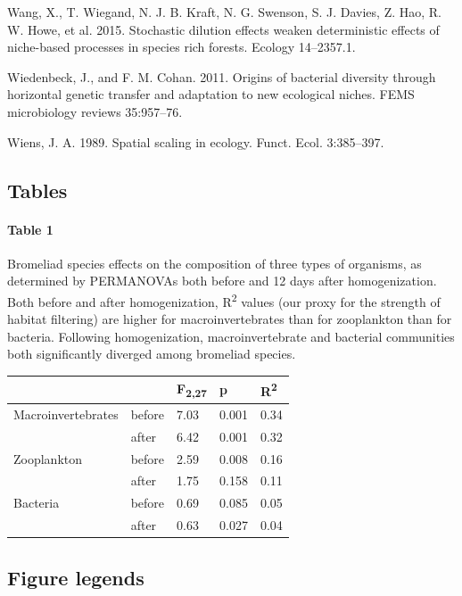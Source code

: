 \documentclass[12pt,]{article}
\let\oldparagraph\paragraph
\renewcommand{\paragraph}[1]{\oldparagraph{#1}\mbox{}}
\begin{document}
\hypertarget{ref-Wang}{}
Wang, X., T. Wiegand, N. J. B. Kraft, N. G. Swenson, S. J. Davies, Z.
Hao, R. W. Howe, et al. 2015. Stochastic dilution effects weaken
deterministic effects of niche-based processes in species rich forests.
Ecology 14--2357.1.

\hypertarget{ref-Wiedenbeck2011}{}
Wiedenbeck, J., and F. M. Cohan. 2011. Origins of bacterial diversity
through horizontal genetic transfer and adaptation to new ecological
niches. FEMS microbiology reviews 35:957--76.

\hypertarget{ref-Wiens1989-vw}{}
Wiens, J. A. 1989. Spatial scaling in ecology. Funct. Ecol. 3:385--397.

\newpage

\subsection{Tables}\label{tables}

\paragraph{Table 1}\label{table-1}

Bromeliad species effects on the composition of three types of
organisms, as determined by PERMANOVAs both before and 12 days after
homogenization. Both before and after homogenization,
R\textsuperscript{2} values (our proxy for the strength of habitat
filtering) are higher for macroinvertebrates than for zooplankton than
for bacteria. Following homogenization, macroinvertebrate and bacterial
communities both significantly diverged among bromeliad species.

\begin{longtable}[]{@{}lllll@{}}
\toprule
& & F\textsubscript{2,27} & p & R\textsuperscript{2}\tabularnewline
\midrule
\endhead
Macroinvertebrates & before & 7.03 & 0.001 & 0.34\tabularnewline
& after & 6.42 & 0.001 & 0.32\tabularnewline
Zooplankton & before & 2.59 & 0.008 & 0.16\tabularnewline
& after & 1.75 & 0.158 & 0.11\tabularnewline
Bacteria & before & 0.69 & 0.085 & 0.05\tabularnewline
& after & 0.63 & 0.027 & 0.04\tabularnewline
\bottomrule
\end{longtable}

\newpage

\subsection{Figure legends}\label{figure-legends}
\end{document}
